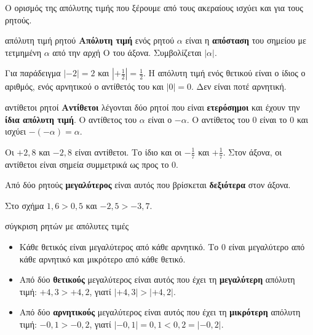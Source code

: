 

Ο ορισμός της απόλυτης τιμής που ξέρουμε από τους ακεραίους ισχύει και για τους ρητούς.

\begin{orismos}{απόλυτη τιμή ρητού}
\textbf{Απόλυτη τιμή} ενός ρητού $\alpha$ είναι η \textbf{απόσταση} του σημείου με τετμημένη $\alpha$ από την αρχή $\mathrm{Ο}$ του άξονα. Συμβολίζεται $|\alpha|$.
\end{orismos}

Για παράδειγμα $|-2|=2$ και $\left|+\frac{1}{2}\right|=\frac{1}{2}$. Η απόλυτη τιμή ενός θετικού είναι ο ίδιος ο αριθμός, ενός αρνητικού ο αντίθετός του και $|0|=0$. Δεν είναι ποτέ αρνητική.

\begin{center}
\end{center}

\begin{orismos}{αντίθετοι ρητοί}
\textbf{Αντίθετοι} λέγονται δύο ρητοί που είναι \textbf{ετερόσημοι} και έχουν την \textbf{ίδια απόλυτη τιμή}. Ο αντίθετος του $\alpha$ είναι ο $-\alpha$. Ο αντίθετος του $0$ είναι το $0$ και ισχύει $-(-\alpha)=\alpha$.
\end{orismos}

Οι $+2{,}8$ και $-2{,}8$ είναι αντίθετοι. Το ίδιο και οι $-\frac{1}{7}$ και $+\frac{1}{7}$. Στον άξονα, οι αντίθετοι είναι σημεία συμμετρικά ως προς το $0$.


Από δύο ρητούς \textbf{μεγαλύτερος} είναι αυτός που βρίσκεται \textbf{δεξιότερα} στον άξονα.

\begin{center}
\end{center}

Στο σχήμα $1{,}6>0{,}5$ και $-2{,}5>-3{,}7$.

\begin{kanonas}{σύγκριση ρητών με απόλυτες τιμές}
\begin{itemize}[leftmargin=1.2em,itemsep=0.3ex,topsep=2pt]
\item Κάθε θετικός είναι μεγαλύτερος από κάθε αρνητικό. Το $0$ είναι μεγαλύτερο από κάθε αρνητικό και μικρότερο από κάθε θετικό.
\item Από δύο \textbf{θετικούς} μεγαλύτερος είναι αυτός που έχει τη \textbf{μεγαλύτερη} απόλυτη τιμή: $+4{,}3>+4{,}2$, γιατί $|{+4{,}3}|>|{+4{,}2}|$.
\item Από δύο \textbf{αρνητικούς} μεγαλύτερος είναι αυτός που έχει τη \textbf{μικρότερη} απόλυτη τιμή: $-0{,}1>-0{,}2$, γιατί $|{-0{,}1}|=0{,}1<0{,}2=|{-0{,}2}|$.
\end{itemize}
\end{kanonas}

